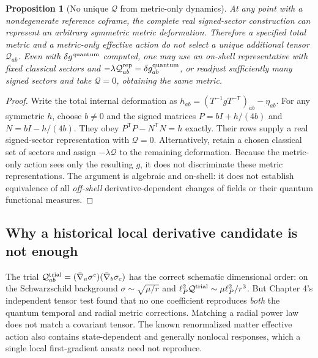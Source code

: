 \documentclass[11pt,a4paper]{article}
\newtheorem{proposition}[theorem]{Proposition}
\theoremstyle{remark}\newtheorem{remark}[theorem]{Remark}
\begin{document}
\begin{proposition}[No unique $\mathcal Q$ from metric-only dynamics]\label{prop:qgd138-nounique}
At any point with a nondegenerate reference coframe, the complete real
signed-sector construction can represent an arbitrary symmetric metric
deformation. Therefore a specified total metric and a metric-only
effective action do not select a unique additional tensor
$\mathcal Q_{ab}$. Even with $\delta g^{\rm quantum}$ computed,
one may use an on-shell representative with fixed classical sectors
and $-\lambda\mathcal Q_{ab}^{\rm rep}=\delta g_{ab}^{\rm quantum}$,
\emph{or} readjust sufficiently many signed sectors and take
$\mathcal Q=0$, obtaining the same metric.
\end{proposition}
\begin{proof}
Write the total internal deformation as
$h_{ab}=(T^{-1}gT^{-\mathsf T})_{ab}-\eta_{ab}$.
For any symmetric $h$, choose $b\ne0$ and the signed matrices
$P=bI+h/(4b)$ and $N=bI-h/(4b)$. They obey
$P^{\mathsf T}P-N^{\mathsf T}N=h$ exactly. Their rows supply a
real signed-sector representation with $\mathcal Q=0$.
Alternatively, retain a chosen classical set of sectors and assign
$-\lambda\mathcal Q$ to the remaining deformation. Because the
metric-only action sees only the resulting $g$, it does not
discriminate these metric representations. The argument is
algebraic and on-shell: it does not establish equivalence of all
\emph{off-shell} derivative-dependent changes of fields or their
quantum functional measures.
\end{proof}

\subsection{Why a historical local derivative candidate is not enough}
The trial $\mathcal Q_{ab}^{\rm trial}=
(\bar\nabla_a\sigma^c)(\bar\nabla_b\sigma_c)$
has the correct schematic dimensional order: on the Schwarzschild
background $\sigma\sim\sqrt{\mu/r}$ and
$\ell_P^2\mathcal Q^{\rm trial}\sim\mu\ell_P^2/r^3$.
But Chapter 4's independent tensor test found that no one coefficient
reproduces \emph{both} the quantum temporal and radial metric corrections.
Matching a radial power law does not match a covariant tensor.
The known renormalized matter effective action also contains
state-dependent and generally nonlocal responses, which a single
local first-gradient ansatz need not reproduce.
\end{document}
